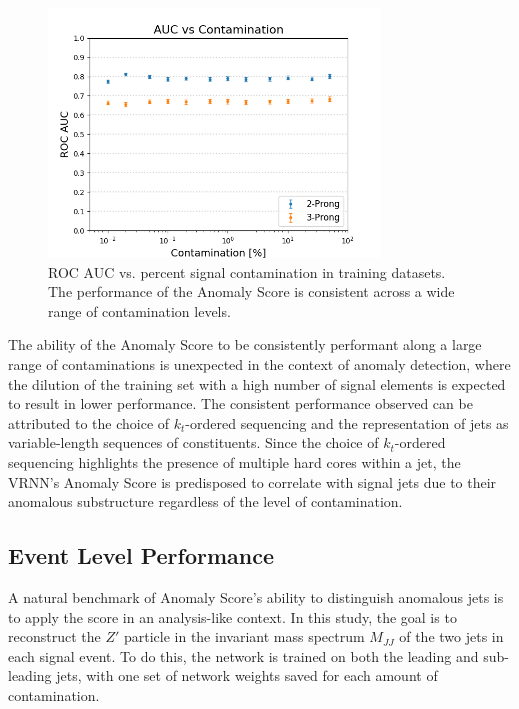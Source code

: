 \documentclass[12pt, a4paper]{article}
\begin{document}
\begin{figure}[H]
	\begin{center}
		\includegraphics[width=250pt]{imgs/bugfix/AUC_vs_Contam_Lead_SaveForPaper.png}
	\end{center}
	\caption{ROC AUC vs. percent signal contamination in training datasets. The performance of the Anomaly Score is consistent across a wide range of contamination levels.}
	\label{fig:aucs_vs_contam}
\end{figure}


The ability of the Anomaly Score to be consistently performant along a large range of contaminations is unexpected in the context of anomaly detection, where the dilution of the training set with a high number of signal elements is expected to result in lower performance.
The consistent performance observed can be attributed to the choice of $k_t$-ordered sequencing and the representation of jets as variable-length sequences of constituents. Since the choice of $k_t$-ordered sequencing highlights the presence of multiple hard cores within a jet, the VRNN's Anomaly Score is predisposed to correlate with signal jets due to their anomalous substructure regardless of the level of contamination.




\subsection{Event Level Performance}


A natural benchmark of Anomaly Score's ability to distinguish anomalous jets is to apply the score in an analysis-like context. In this study, the goal is to reconstruct the $Z'$ particle in the invariant mass spectrum $M_{JJ}$ of the two jets in each signal event. To do this, the network is trained on both the leading and sub-leading jets, with one set of network weights saved for each amount of contamination. 
\end{document}
